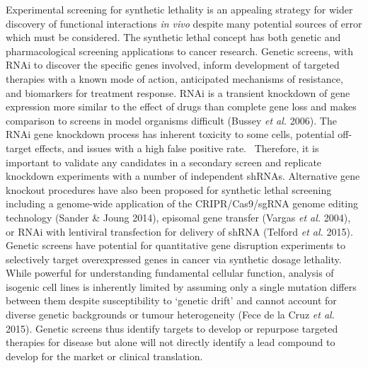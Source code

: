 Experimental screening for synthetic lethality is an appealing strategy
for wider discovery of functional interactions \textit{in vivo} despite
many potential sources of error which must be considered. The
synthetic lethal concept has both genetic and pharmacological screening
applications to cancer research. Genetic screens, with RNAi to
discover the specific genes involved, inform development of targeted
therapies with a known mode of action, anticipated mechanisms of
resistance, and biomarkers for treatment response. RNAi is a
transient knockdown of gene expression more similar to the effect of
drugs than complete gene loss and makes comparison to screens in model
organisms difficult (Bussey\textit{ et al.} 2006). The RNAi gene
knockdown process has inherent toxicity to some cells, potential
off-target effects, and issues with a high false positive rate.
\ Therefore, it is important to validate any candidates in a secondary
screen and replicate knockdown experiments with a number of independent
shRNAs. Alternative gene knockout procedures have also been proposed
for synthetic lethal screening including a genome-wide application of
the CRIPR/Cas9/sgRNA genome editing technology (Sander \& Joung 2014),
episomal gene transfer (Vargas\textit{ et al.} 2004), or RNAi with
lentiviral transfection for delivery of shRNA (Telford\textit{ et al.}
2015). Genetic screens have potential for quantitative gene
disruption experiments to selectively target overexpressed genes in
cancer via synthetic dosage lethality. While powerful for
understanding fundamental cellular function, analysis of isogenic cell
lines is inherently limited by assuming only a single mutation differs
between them despite susceptibility to {\textquoteleft}genetic
drift{\textquoteright} and cannot account for diverse genetic
backgrounds or tumour heterogeneity (Fece de la Cruz\textit{ et al.}
2015). Genetic screens thus identify targets to develop or repurpose
targeted therapies for disease but alone will not directly identify a
lead compound to develop for the market or clinical translation. 


